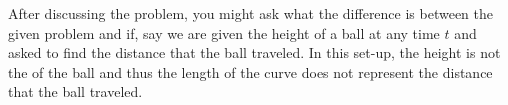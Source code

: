 \documentclass[noinstructornotes]{ximera}
\begin{document}
\begin{instructorNotes}
After discussing the problem, you might ask what the difference is between the given problem and if, say we are given the height of a ball at any time $t$ and asked to find the distance that the ball traveled.  
In this set-up, the height is not the  of the ball and thus the length of the curve does not represent the distance that the ball traveled.  
\end{instructorNotes}


















	
	
	
	
	
	
	
	
	

	










								
				
				
	
\end{document}
